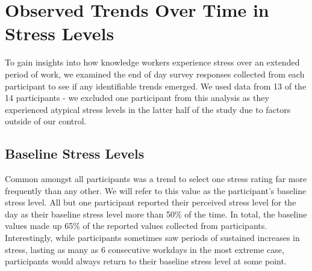 %



\section{Observed Trends Over Time in Stress Levels}
\label{stressTrends}

To gain insights into how knowledge workers experience stress over an
extended period of work, we examined the end of day survey responses
collected from each participant to see if any identifiable trends
emerged. We used data from 13 of the 14 participants - we excluded one participant
from this analysis as they experienced atypical stress
levels in the latter half of the study due to factors outside of our
control.

\subsection{Baseline Stress Levels}
Common amongst all participants was a trend to select one stress rating
far more frequently than any other. We will refer to this value as the
participant's baseline stress level. All but one participant reported
their perceived stress level for the day as their baseline stress
level more than 50\% of the time. In total, the baseline values made
up 65\% of the reported values collected from
participants. Interestingly, while participants sometimes saw periods
of sustained increases in stress, lasting as many as 6 consecutive
workdays in the most extreme case, participants would always return to
their baseline stress level at some point.

